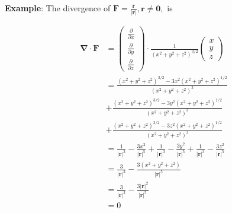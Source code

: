 \begin{paracol}{2}

\textbf{Example}: The divergence of $\mathbf{F} = \frac{\mathbf{r}}{|\mathbf{r}|}, \mathbf{r} \neq \mathbf{0},$ is

\vspace{-10pt}

\begin{align*}
    \mathbf{\nabla} \cdot \mathbf{F} & = \begin{pmatrix}
        \frac{\partial}{\partial x} \\
        \frac{\partial}{\partial y} \\
        \frac{\partial}{\partial z}
    \end{pmatrix} \cdot \frac{1}{(x^2 + y^2 + z^2)^{3/2}} \begin{pmatrix}
        x \\ y \\ z
    \end{pmatrix} \\
    & =\frac{(x^2 + y^2 + z^2)^{3/2} - 3 x^2 (x^2 + y^2 + z^2)^{1/2}}{(x^2 + y^2 + z^2)^3} \\
        & + \frac{(x^2 + y^2 + z^2)^{3/2} - 3 y^2 (x^2 + y^2 + z^2)^{1/2}}{(x^2 + y^2 + z^2)^3} \\
        & + \frac{(x^2 + y^2 + z^2)^{3/2} - 3 z^2 (x^2 + y^2 + z^2)^{1/2}}{(x^2 + y^2 + z^2)^3} \\
    & = \frac{1}{|\mathbf{r}|^3} - \frac{3x^2}{|\mathbf{r}|^5}
        + \frac{1}{|\mathbf{r}|^3} - \frac{3y^2}{|\mathbf{r}|^5}
        + \frac{1}{|\mathbf{r}|^3} - \frac{3z^2}{|\mathbf{r}|^5} \\
    & = \frac{3}{|\mathbf{r}|^3} - \frac{3 (x^2 + y^2 + z^2)}{|\mathbf{r}|^5} \\
    & = \frac{3}{|\mathbf{r}|^3} - \frac{3 |\mathbf{r}|^2}{|\mathbf{r}|^5} \\
    & = 0
\end{align*}


\end{paracol}
